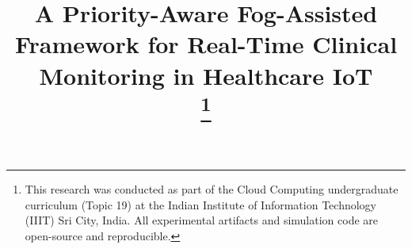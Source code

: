 \documentclass[conference]{IEEEtran}
\begin{document}
\title{A Priority-Aware Fog-Assisted Framework for Real-Time Clinical Monitoring in Healthcare IoT\\
\thanks{This research was conducted as part of the Cloud Computing undergraduate curriculum (Topic 19) at the Indian Institute of Information Technology (IIIT) Sri City, India. All experimental artifacts and simulation code are open-source and reproducible.}
}

\author{
}

\maketitle
\end{document}
